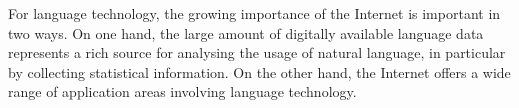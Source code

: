 \begin{multicols}{2}
For language technology, the growing importance of the Internet is important in two ways. On one hand, the large amount of digitally available language data represents a rich source for analysing the usage of natural language, in particular by collecting statistical information. On the other hand, the Internet offers a wide range of application areas involving language technology. 



\end{multicols}

\clearpage



